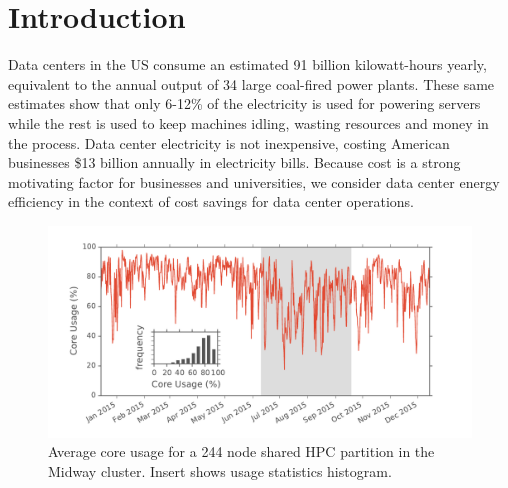 

\section{Introduction}

Data centers in the US consume an estimated 91 billion kilowatt-hours yearly, equivalent to the annual output of 34 large coal-fired power plants.\cite{Delforge2014} These same estimates show that only 6-12\% of the electricity is used for powering servers while the rest is used to keep machines idling, wasting resources and money in the process. Data center electricity is not inexpensive, costing American businesses \$13 billion annually in electricity bills.\cite{Delforge2014} Because cost is a strong motivating factor for businesses and universities, we consider data center energy efficiency in the context of cost savings for data center operations. \\

\begin{figure}[t]
	\begin{center}
		\includegraphics[scale=0.38]{edeals/pwr_model_ins}
	\end{center}
	\caption{Average core usage for a 244 node shared HPC partition in the Midway cluster. Insert shows usage statistics histogram.}
	\label{prw_model_ins}
\end{figure}

